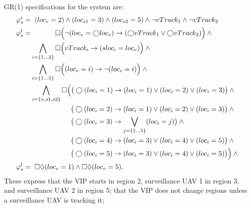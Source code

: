 \documentclass[runningheads]{llncs}
\begin{document}
GR(1) specifications for the system are:
{\small
\begin{align}
\varphi_s^i  = & \;\; (loc_v = 2) \land (loc_{s1} = 3) \land (loc_{s2} = 5) \land \lnot vTrack_1 \land \lnot vTrack_2 \label{eq:vipSysInit} \\
\varphi_s^t  =  & \quad\quad\quad\;\; \square \Big( \lnot(loc_v = \varbigcirc loc_v) \rightarrow (\varbigcirc vTrack_1 \lor \varbigcirc vTrack_2) \Big)  \land \mbox{} \label{eq:vipNoMoveUnlessTracked} \\
 & \bigwedge_{i = \{1 \ldots 2\}} \square \Big(vTrack_i \rightarrow (sloc_i = loc_v)\Big) \land \mbox{} \label{eq:vipSysVtrack} \\
& \bigwedge_{i = \{1 \ldots 5\}} \square \Big((loc_v = i) \rightarrow \lnot(loc_e = i)\Big) \land \mbox{} \label{eq:vipSysNoEloc} \\
 & \bigwedge_{i = \{v, s1, s2\}} \square \Big(\big( \varbigcirc(loc_i = 1) \rightarrow (loc_i = 1) \lor (loc_i = 2) \lor (loc_i = 3)   \big) \land \mbox{} \label{eq:vipSysTrans1} \\
 & \quad\quad\quad\quad\quad\;\;\; \big(\varbigcirc (loc_i = 2) \rightarrow (loc_i = 1) \lor (loc_i = 2) \lor (loc_i = 3)   \big) \land \mbox{} \label{eq:vipSysTrans2} \\
  & \quad\quad\quad\quad\quad\;\;\; \big(\varbigcirc (loc_i = 3) \rightarrow \bigvee_{j=\{1\ldots5\}} (loc_i = j) \big) \land \mbox{}  \label{eq:vipSysTrans3} \\
  & \quad\quad\quad\quad\quad\;\;\; \big(\varbigcirc (loc_i = 4) \rightarrow (loc_i = 3) \lor (loc_i = 4) \lor (loc_i = 5)   \big) \land \mbox{} \label{eq:vipSysTrans4} \\
  & \quad\quad\quad\quad\quad\;\;\; \big(\varbigcirc (loc_i = 5) \rightarrow (loc_i = 3) \lor (loc_i = 4) \lor (loc_i = 5)  \big)  \Big) \land \mbox{} \label{eq:vipSysTrans5} \\
\varphi_s^l = & \;\; \square \lozenge (loc_v = 1) \land \square \lozenge (loc_v = 5). \label{eq:vipSysLiveness}
\end{align}
}
\noindent These express  that the VIP starts in region 2, surveillance UAV 1 in region 3, and surveillance UAV 2 in region 5; 
 that the VIP does not change regions unless a surveillance UAV is tracking it; 
\end{document}
